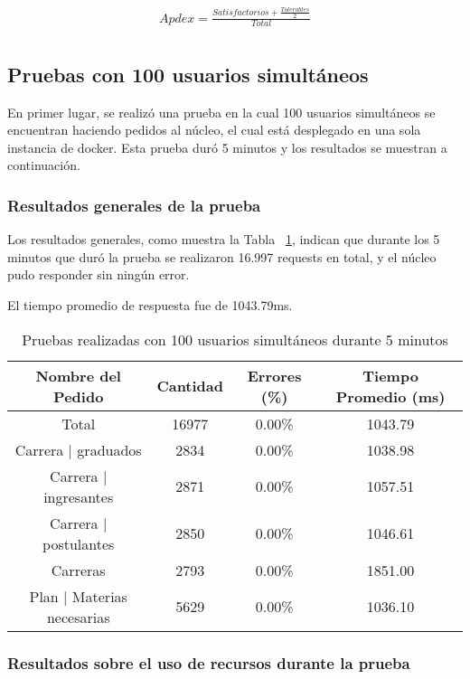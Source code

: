 \begin{align*}
  Apdex = \frac{Satisfactorios + \frac{Tolerables}{2}}{Total}\\
\end{align*}

\break
\subsection{Pruebas con 100 usuarios simultáneos}
En primer lugar, se realizó una prueba en la cual 100 usuarios simultáneos se encuentran haciendo pedidos al núcleo, el cual está desplegado en una sola instancia de docker.
Esta prueba duró 5 minutos y los resultados se muestran a continuación.


\subsubsection{Resultados generales de la prueba}


Los resultados generales, como muestra la Tabla ~\ref{tab:100u_5m_gen}, indican que durante los 5 minutos que duró la prueba se realizaron 16.997 requests en total, y el núcleo pudo responder sin ningún error.

El tiempo promedio de respuesta fue de 1043.79ms.

\begin{table}[!htbp]
    \centering
    \makegapedcells
    \begin{tabular}{|c|c|c|c|}
    \hline
    Nombre del Pedido & Cantidad & Errores (\%) & Tiempo Promedio (ms) \\ \hline
    Total & 16977 & 0.00\% & 1043.79\\ \hline
    Carrera | graduados & 2834 & 0.00\% & 1038.98\\ \hline
    Carrera | ingresantes & 2871 & 0.00\% & 1057.51\\ \hline
    Carrera | postulantes & 2850 & 0.00\% & 1046.61\\ \hline
    Carreras & 2793 & 0.00\% & 1851.00\\ \hline
    Plan | Materias necesarias & 5629 & 0.00\% & 1036.10\\ \hline
    
    \end{tabular}
    \caption{Pruebas realizadas con 100 usuarios simultáneos durante 5 minutos}
    \label{tab:100u_5m_gen}
\end{table}


\subsubsection{Resultados sobre el uso de recursos durante la prueba}

